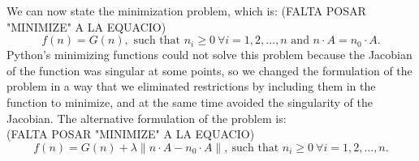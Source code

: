\documentclass[a4paper,10pt]{article}
\theoremstyle{plain}
\theoremstyle{definition}
\theoremstyle{remark}
\begin{document}
We can now state the minimization problem, which is:
(FALTA POSAR "MINIMIZE" A LA EQUACIO)
\begin{equation}
f(n) = G(n), \text{ such that } n_{i} \geq 0 \ \forall i=1,2,\dots,n \text{ and } n\cdot A = n_0\cdot A.
\end{equation}
Python's minimizing functions could not solve this problem because the Jacobian of the function was singular at some points, so we changed the formulation of the problem in a way that we eliminated restrictions by including them in the function to minimize, and at the same time avoided the singularity of the Jacobian.
The alternative formulation of the problem is:\\
(FALTA POSAR "MINIMIZE" A LA EQUACIO)
\begin{equation}
f(n) = G(n) + \lambda \lVert n\cdot A - n_0\cdot A \lVert, \ \text{such that } n_{i} \geq 0 \ \forall i=1,2,\dots,n.
\end{equation}
\end{document}
